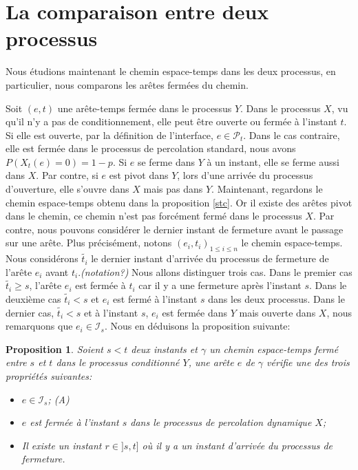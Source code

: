 \documentclass[titlepage,a4paper,12pt]{article}
\newcounter{prop}
\newtheorem{propo}[prop]{Proposition}
\begin{document}
\section{La comparaison entre deux processus}
Nous étudions maintenant le chemin espace-temps dans les deux processus, en particulier, nous comparons les arêtes fermées du chemin.

Soit $(e,t)$ une arête-temps fermée dans le processus $Y$. Dans le processus $X$, vu qu'il n'y a pas de conditionnement, elle peut être ouverte ou fermée à l'instant $t$. Si elle est ouverte, par la définition de l'interface, $e\in \mathcal{P}_t$. Dans le cas contraire, elle est fermée dans le processus de percolation standard, nous avons $P(X_t(e) = 0) = 1-p$. Si $e$ se ferme dans $Y$ à un instant, elle se ferme aussi dans $X$. Par contre, si $e$ est pivot dans $Y$, lors d'une arrivée du processus d'ouverture, elle s'ouvre dans $X$ mais pas dans $Y$. Maintenant, regardons le chemin espace-temps obtenu dans la proposition \ref{stc}. Or il existe des arêtes pivot dans le chemin, ce chemin n'est pas forcément fermé dans le processus $X$. Par contre, nous pouvons considérer le dernier instant de fermeture avant le passage sur une arête. Plus précisément, notons $(e_i,t_i)_{1\leqslant i \leqslant n}$ le chemin espace-temps. Nous considérons $\tilde{t_i}$ le dernier instant d'arrivée du processus de fermeture de l'arête $e_i$ avant $t_i$.\emph{\color{blue}(notation?)} Nous allons distinguer trois cas. Dans le premier cas $\tilde{t_i}\geqslant s$, l'arête $e_i$ est fermée à $t_i$ car il y a une fermeture après l'instant $s$. Dans le deuxième cas $\tilde{t_i}< s$ et $e_i$ est fermé à l'instant $s$ dans les deux processus. Dans le dernier cas, $\tilde{t_i}< s$ et à l'instant $s$, $e_i$ est fermée dans $Y$ mais ouverte dans $X$, nous remarquons que $e_i \in \mathcal{I}_s$. Nous en déduisons la proposition suivante:

\begin{propo}\label{couple} Soient $s<t$ deux instants et $\gamma$ un chemin espace-temps fermé entre $s$ et $t$ dans le processus conditionné $Y$, une arête $e$ de $\gamma$ vérifie une des trois propriétés suivantes:
\begin{itemize}[leftmargin = 0.9cm]
\item[(A)] $e\in \mathcal{I}_s$;
(A)\item [(B)] $e$ est fermée à l'instant $s$ dans le processus de percolation dynamique $X$;
\item[(C)] Il existe un instant $r\in ]s,t]$ où il y a un instant d'arrivée du processus de fermeture.
\end{itemize}
\end{propo}
\end{document}
